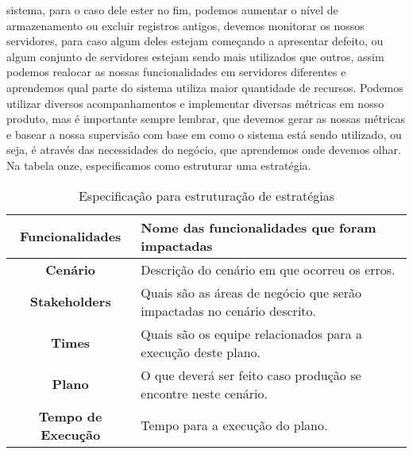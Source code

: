       sistema, para o caso dele ester no fim, podemos aumentar o nível de armazenamento
      ou excluir registros antigos, devemos monitorar os nossos servidores, para
      caso algum deles estejam começando a apresentar defeito, ou algum conjunto
      de servidores estejam sendo mais utilizados que outros, assim podemos realocar
      as nossas funcionalidades em servidores diferentes e aprendemos qual parte
      do sistema utiliza maior quantidade de recursos. Podemos utilizar diversos
      acompanhamentos e implementar diversas métricas em nosso produto, mas é
      importante sempre lembrar, que devemos gerar as nossas métricas e basear a
      nossa supervisão com base em como o sistema está sendo utilizado, ou seja,
      é através das necessidades do negócio, que aprendemos onde devemos olhar.
      Na tabela onze, especificamos como estruturar uma estratégia.\newline

      \begin{table}[h!]
        \centering
        \begin{tabular}{|c|p{10cm}|}
          \hline
          \textbf{Funcionalidades} &
          Nome das funcionalidades que foram impactadas \\ \hline
          \textbf{Cenário} &
          Descrição do cenário em que ocorreu os erros. \\ \hline
          \textbf{Stakeholders} &
          Quais são as áreas de negócio que serão impactadas no cenário descrito. \\ \hline
          \textbf{Times} &
          Quais são os equipe relacionados para a execução deste plano. \\ \hline
          \textbf{Plano} &
          O que deverá ser feito caso produção se encontre neste cenário. \\ \hline
          \textbf{Tempo de Execução} &
          Tempo para a execução do plano. \\ \hline
        \end{tabular}
        \caption{Especificação para estruturação de estratégias}
        \label{Tabela:11}
      \end{table}

